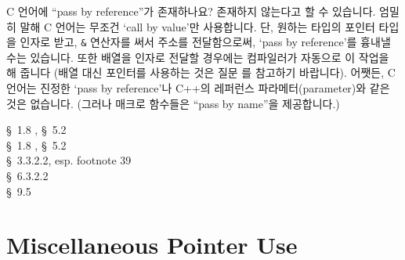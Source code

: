\begin{faq}
	C 언어에 ``pass by reference''가 존재하나요?
\A
	존재하지 않는다고 할 수 있습니다.  엄밀히 말해 C 언어는 무조건
	`call by value'만 사용합니다.  단, 원하는 타입의 포인터 타입을
	인자로 받고, \verb+&+ 연산자를 써서 주소를 전달함으로써,
	`pass by reference'를 흉내낼 수는 있습니다.
	또한 배열을 인자로 전달할 경우에는 컴파일러가 자동으로 이 작업을
	해 줍니다 (배열 대신 포인터를 사용하는 것은 질문 를 참고하기
	바랍니다).  어쨋든, C 언어는 진정한 `pass by reference'나
	C++의 레퍼런스 파라메터(parameter)와 같은 것은 없습니다.
	(그러나 매크로 함수들은 ``pass by name''을 제공합니다.)

\R	\cite{kr1} \S\ 1.8 , \S\ 5.2  \\
	\cite{kr2} \S\ 1.8 , \S\ 5.2  \\
        \cite{ansi} \S\ 3.3.2.2, esp. footnote 39 \\
	\cite{c89} \S\ 6.3.2.2 \\
	\cite{hs} \S\ 9.5 
\end{faq}

\section{Miscellaneous Pointer Use}

